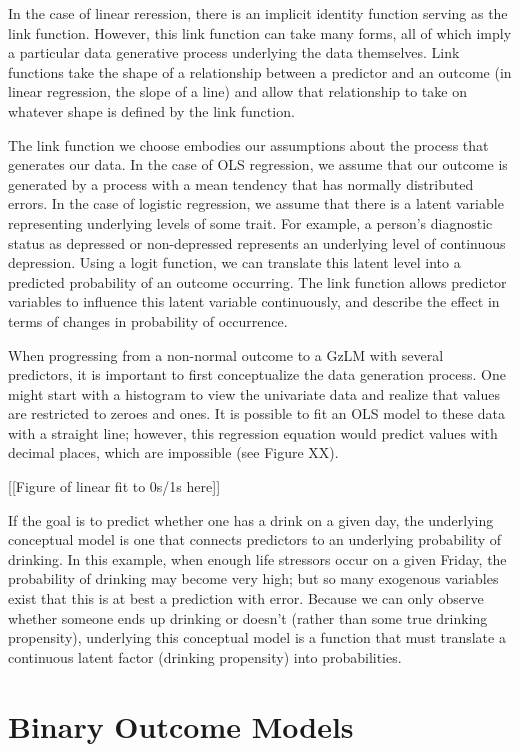 \documentclass[jou, apacite]{apa6}
\begin{document}
In the case of linear reression, there is an implicit identity function serving as the link function.
However, this link function can take many forms, all of which imply a particular data generative process underlying the data themselves.
Link functions take the shape of a relationship between a predictor and an outcome (in linear regression, the slope of a line) and allow that relationship to take on whatever shape is defined by the link function.

The link function we choose embodies our assumptions about the process that generates our data.
In the case of OLS regression, we assume that our outcome is generated by a process with a mean tendency that has normally distributed errors.
In the case of logistic regression, we assume that there is a latent variable representing underlying levels of some trait. 
For example, a person's diagnostic status as depressed or non-depressed represents an underlying level of continuous depression. 
Using a logit function, we can translate this latent level into a predicted probability of an outcome occurring.
The link function allows predictor variables to influence this latent variable continuously, and describe the effect in terms of changes in probability of occurrence.

When progressing from a non-normal outcome to a GzLM with several predictors, it is important to first conceptualize the data generation process. 
One might start with a histogram to view the univariate data and realize that values are restricted to zeroes and ones.
It is possible to fit an OLS model to these data with a straight line; however, this regression equation would predict values with decimal places, which are impossible (see Figure XX).

[[Figure of linear fit to 0s/1s here]]

If the goal is to predict whether one has a drink on a given day, the underlying conceptual model is one that connects predictors to an underlying probability of drinking.
In this example, when enough life stressors occur on a given Friday, the probability of drinking may become very high; but so many exogenous variables exist that this is at best a prediction with error.
Because we can only observe whether someone ends up drinking or doesn't (rather than some true drinking propensity), underlying this conceptual model is a function that must translate a continuous latent factor (drinking propensity) into probabilities.


\section{Binary Outcome Models}
\end{document}
